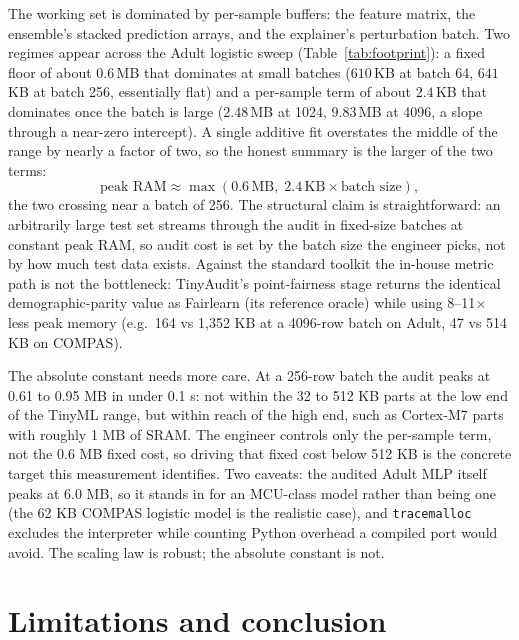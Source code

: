 \documentclass{article}
\begin{document}
The working set is dominated by per-sample buffers: the feature matrix, the ensemble's stacked prediction arrays, and the explainer's perturbation batch. Two regimes appear across the Adult logistic sweep (Table~\ref{tab:footprint}): a fixed floor of about $0.6$\,MB that dominates at small batches ($610$\,KB at batch 64, $641$\,KB at batch 256, essentially flat) and a per-sample term of about $2.4$\,KB that dominates once the batch is large ($2.48$\,MB at 1024, $9.83$\,MB at 4096, a slope through a near-zero intercept). A single additive fit overstates the middle of the range by nearly a factor of two, so the honest summary is the larger of the two terms:
\begin{equation}
  \text{peak RAM} \approx \max\!\left(0.6\,\text{MB},\; 2.4\,\text{KB} \times \text{batch size}\right),
\end{equation}
the two crossing near a batch of 256. The structural claim is straightforward: an arbitrarily large test set streams through the audit in fixed-size batches at constant peak RAM, so audit cost is set by the batch size the engineer picks, not by how much test data exists. Against the standard toolkit the in-house metric path is not the bottleneck: TinyAudit's point-fairness stage returns the identical demographic-parity value as Fairlearn (its reference oracle) while using 8--11$\times$ less peak memory (e.g.\ 164 vs 1{,}352 KB at a 4096-row batch on Adult, 47 vs 514 KB on COMPAS).

The absolute constant needs more care. At a 256-row batch the audit peaks at 0.61 to 0.95 MB in under 0.1 s: not within the 32 to 512 KB parts at the low end of the TinyML range, but within reach of the high end, such as Cortex-M7 parts with roughly 1 MB of SRAM. The engineer controls only the per-sample term, not the 0.6 MB fixed cost, so driving that fixed cost below 512 KB is the concrete target this measurement identifies. Two caveats: the audited Adult MLP itself peaks at 6.0 MB, so it stands in for an MCU-class model rather than being one (the 62 KB COMPAS logistic model is the realistic case), and \texttt{tracemalloc} excludes the interpreter while counting Python overhead a compiled port would avoid. The scaling law is robust; the absolute constant is not.

\section{Limitations and conclusion}
\label{sec:limitations}
\end{document}
